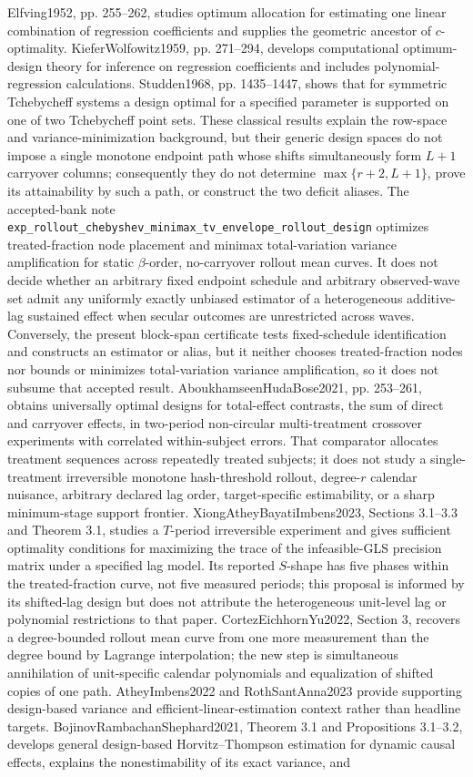 \documentclass{article}
\begin{document}
Elfving1952, pp. 255--262, studies optimum allocation for estimating one linear combination of regression coefficients and supplies the geometric ancestor of \(c\)-optimality. KieferWolfowitz1959, pp. 271--294, develops computational optimum-design theory for inference on regression coefficients and includes polynomial-regression calculations. Studden1968, pp. 1435--1447, shows that for symmetric Tchebycheff systems a design optimal for a specified parameter is supported on one of two Tchebycheff point sets. These classical results explain the row-space and variance-minimization background, but their generic design spaces do not impose a single monotone endpoint path whose shifts simultaneously form \(L+1\) carryover columns; consequently they do not determine \(\max\{r+2,L+1\}\), prove its attainability by such a path, or construct the two deficit aliases. The accepted-bank note \texttt{exp\_rollout\_chebyshev\_minimax\_tv\_envelope\_rollout\_design} optimizes treated-fraction node placement and minimax total-variation variance amplification for static \(\beta\)-order, no-carryover rollout mean curves. It does not decide whether an arbitrary fixed endpoint schedule and arbitrary observed-wave set admit any uniformly exactly unbiased estimator of a heterogeneous additive-lag sustained effect when secular outcomes are unrestricted across waves. Conversely, the present block-span certificate tests fixed-schedule identification and constructs an estimator or alias, but it neither chooses treated-fraction nodes nor bounds or minimizes total-variation variance amplification, so it does not subsume that accepted result. AboukhamseenHudaBose2021, pp. 253--261, obtains universally optimal designs for total-effect contrasts, the sum of direct and carryover effects, in two-period non-circular multi-treatment crossover experiments with correlated within-subject errors. That comparator allocates treatment sequences across repeatedly treated subjects; it does not study a single-treatment irreversible monotone hash-threshold rollout, degree-\(r\) calendar nuisance, arbitrary declared lag order, target-specific estimability, or a sharp minimum-stage support frontier. XiongAtheyBayatiImbens2023, Sections 3.1--3.3 and Theorem 3.1, studies a \(T\)-period irreversible experiment and gives sufficient optimality conditions for maximizing the trace of the infeasible-GLS precision matrix under a specified lag model. Its reported \(S\)-shape has five phases within the treated-fraction curve, not five measured periods; this proposal is informed by its shifted-lag design but does not attribute the heterogeneous unit-level lag or polynomial restrictions to that paper. CortezEichhornYu2022, Section 3, recovers a degree-bounded rollout mean curve from one more measurement than the degree bound by Lagrange interpolation; the new step is simultaneous annihilation of unit-specific calendar polynomials and equalization of shifted copies of one path. AtheyImbens2022 and RothSantAnna2023 provide supporting design-based variance and efficient-linear-estimation context rather than headline targets. BojinovRambachanShephard2021, Theorem 3.1 and Propositions 3.1--3.2, develops general design-based Horvitz--Thompson estimation for dynamic causal effects, explains the nonestimability of its exact variance, and 
\end{document}
